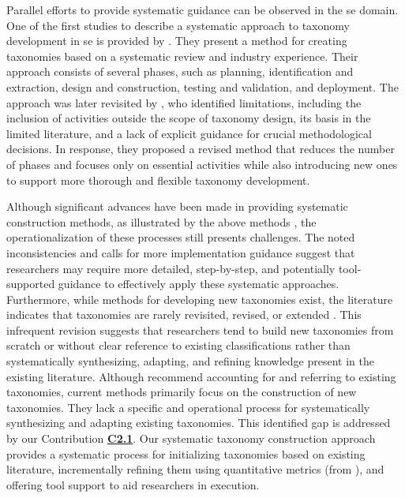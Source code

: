 Parallel efforts to provide systematic guidance can be observed in the \gls{se} domain. One of the first studies to describe a systematic approach to taxonomy development in \gls{se} is provided by \textcite{bayona-ore_critical_2014}. They present a method for creating taxonomies based on a systematic review and industry experience. Their approach consists of several phases, such as planning, identification and extraction, design and construction, testing and validation, and deployment. The approach was later revisited by \textcite{usman_taxonomies_2017}, who identified limitations, including the inclusion of activities outside the scope of taxonomy design, its basis in the limited literature, and a lack of explicit guidance for crucial methodological decisions. In response, they proposed a revised method that reduces the number of phases and focuses only on essential activities while also introducing new ones to support more thorough and flexible taxonomy development.

Although significant advances have been made in providing systematic construction methods, as illustrated by the above methods \cite{kundisch_update_2022,nickerson_method_2013,bayona-ore_critical_2014,usman_taxonomies_2017}, the operationalization of these processes still presents challenges. The noted inconsistencies and calls for more implementation guidance \cite{kundisch_update_2022} suggest that researchers may require more detailed, step-by-step, and potentially tool-supported guidance to effectively apply these systematic approaches. Furthermore, while methods for developing new taxonomies exist, the literature indicates that taxonomies are rarely revisited, revised, or extended \cite{usman_taxonomies_2017}. This infrequent revision suggests that researchers tend to build new taxonomies from scratch or without clear reference to existing classifications rather than systematically synthesizing, adapting, and refining knowledge present in the existing literature. Although \textcite{kundisch_update_2022} recommend accounting for and referring to existing taxonomies, current methods primarily focus on the construction of new taxonomies. They lack a specific and operational process for systematically synthesizing and adapting existing taxonomies. This identified gap is addressed by our Contribution \hyperref[enum:c2]{\textbf{C2.1}}. Our systematic taxonomy construction approach provides a systematic process for initializing taxonomies based on existing literature, incrementally refining them using quantitative metrics (from \textcite{kaplan_introducing_2022}), and offering tool support to aid researchers in execution.

